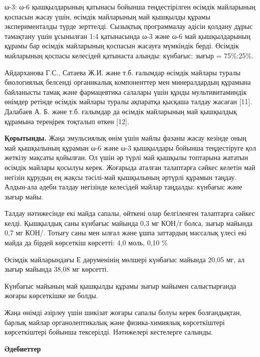 \begin{multicols}{2}
ω-3: ω-6 қышқылдарының қатынасы бойынша теңдестірілген өсімдік
майларының қоспасын жасау үшін, өсімдік майларының май қышқылды құрамы
эксперименталды түрде зерттелді. Сызықтық программалау әдісін қолдану
дұрыс тамақтану үшін ұсынылған 1:4 қатынасында ω-3 және ω-6 май
қышқылдарының құрамы бар өсімдік майларының қоспасын жасауға мүмкіндік
берді. Өсімдік майларының қоспасы келесідей қатынаста алынды: күнбағыс:
зығыр = 75\%:25\%.

Айдарханова Г.С., Сатаева Ж.И. және т.б. ғалымдар өсімдік майлары туралы
биологиялық белсенді органикалық компоненттер мен минералдардың құрамына
байланысты тамақ және фармацевтика салалары үшін құнды мультивитаминдік
өнімдер ретінде өсімдік майлары туралы ақпаратқа қысқаша талдау жасаған
{[}11{]}. Далабаев А. Б. және т.б. ғалымдар да өсімдік майларының май
қышқылдық құрамына тереңірек тоқталып өткен {[}12{]}.

{\bfseries Қорытынды.} Жаңа эмульсиялық өнім үшін майлы фазаны жасау
кезінде оның май қышқылының құрамын ω-6 және ω-3 қышқылдары бойынша
теңдестіруге қол жеткізу мақсаты қойылған. Ол үшін әр түрлі май қышқылы
топтарына жататын өсімдік майлары қосылуы керек. Жоғарыда аталған
талаптарға сәйкес келетін май негізін құрудың ең жақсы тәсілі-май
қышқылының әртүрлі құрамын таңдау. Алдын-ала әдеби талдау негізінде
келесідей майлар таңдалды: күнбағыс және зығыр майы.

Талдау нәтижесінде екі майда сапалы, өйткені олар белгіленген талаптарға
сәйкес келді. Қышқылдық саны күнбағыс майында 0,3 мг КОН/г болса, зығыр
майында 0,7 мг КОН/. Тотығу саны мен ылғал және ұшпа заттардың массалық
үлесі екі майда да бірдей көрсеткіш көрсетті: 4,0 моль, 0,10 \%

Өсімдік майларындағы Е дәруменінің мөлшері күнбағыс майында 20,05 мг, ал
зығыр майында 38,08 мг көрсетті.

Күнбағыс майының май қышқылды құрамы зығыр майымен салыстырғанда жоғары
көрсеткішке ие болды.

Жаңа өнімді әзірлеу үшін шикізат жоғары сапалы болуы керек болғандықтан,
барлық майлар органолептикалық және физика-химиялық көрсеткіштері
көрсеткіштері бойынша тексерілді. Нәтижелері кестелерге салынды.
\end{multicols}

\begin{center}
{\bfseries Әдебиеттер}
\end{center}

